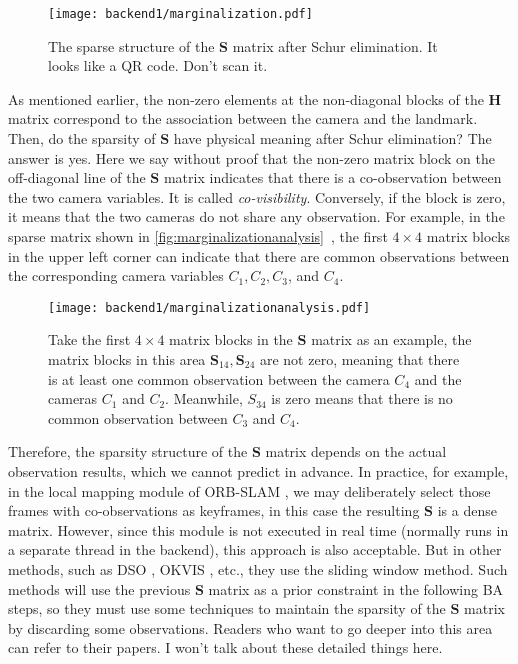 \begin{figure}[!ht]
	\centering
	\texttt{[image: backend1/marginalization.pdf]}
	\caption{The sparse structure of the $\mathbf{S}$ matrix after Schur elimination. It looks like a QR code. Don't scan it.}
	\label{fig:marginalization}
\end{figure}

As mentioned earlier, the non-zero elements at the non-diagonal blocks of the $\mathbf{H}$ matrix correspond to the association between the camera and the landmark. Then, do the sparsity of $\mathbf{S}$ have physical meaning after Schur elimination? The answer is yes. Here we say without proof that the non-zero matrix block on the off-diagonal line of the $\mathbf{S}$ matrix indicates that there is a co-observation between the two camera variables. It is called \textit{co-visibility}. Conversely, if the block is zero, it means that the two cameras do not share any observation. For example, in the sparse matrix shown in \autoref{fig:marginalizationanalysis}~, the first $4 \times 4$ matrix blocks in the upper left corner can indicate that there are common observations between the corresponding camera variables $C_1, C_2, C_3$, and $C_4$.

\begin{figure}[!htp]
	\centering
	\texttt{[image: backend1/marginalizationanalysis.pdf]}
	\caption{Take the first $4 \times 4$ matrix blocks in the $\mathbf{S}$ matrix as an example, the matrix blocks in this area $\mathbf{S}_{14}, \mathbf{S}_{24}$ are not zero, meaning that there is at least one common observation between the camera $C_4$ and the cameras $C_1$ and $C_2$. Meanwhile, $S_{34}$ is zero means that there is no common observation between $C_3$ and $C_4$.}
	\label{fig:marginalizationanalysis}
\end{figure}

Therefore, the sparsity structure of the $\mathbf{S}$ matrix depends on the actual observation results, which we cannot predict in advance. In practice, for example, in the local mapping module of ORB-SLAM {\cite{Mur-Artal2015}}, we may deliberately select those frames with co-observations as keyframes, in this case the resulting $\mathbf{S}$ is a dense matrix. However, since this module is not executed in real time (normally runs in a separate thread in the backend), this approach is also acceptable. But in other methods, such as DSO {\cite{Engel2016}}, OKVIS {\cite{Leutenegger2015}}, etc., they use the sliding window method. Such methods will use the previous $\mathbf{S}$ matrix as a prior constraint in the following BA steps, so they must use some techniques to maintain the sparsity of the $\mathbf{S}$ matrix by discarding some observations. Readers who want to go deeper into this area can refer to their papers. I won't talk about these detailed things here.

